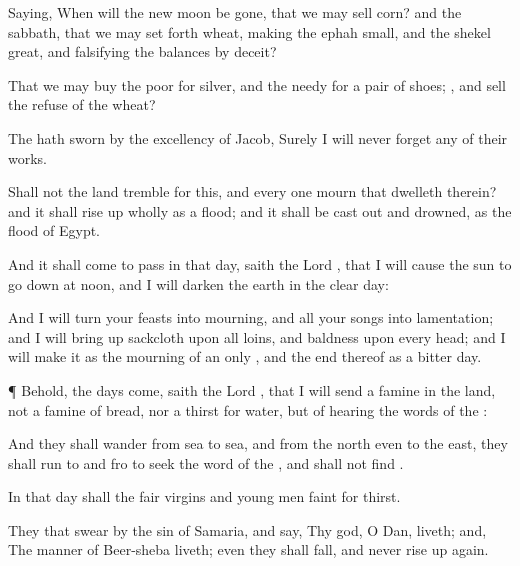 {Saying, When will the new
moon be
gone, that we may
sell
corn? and the
sabbath, that we may set
forth
wheat, making the
ephah
small, and the
shekel
great, and
falsifying the
balances by
deceit?

That we may
buy the
poor for
silver, and the
needy for a pair of
shoes;
{}, and
sell the
refuse of the
wheat?

The
{} hath
sworn by the
excellency of
Jacob, Surely I will
never
forget any of their
works.

Shall not the
land
tremble for this, and every one
mourn that
dwelleth therein? and it shall rise
up wholly as a
flood; and it shall be cast
out and
drowned, as
{} the
flood of
Egypt.

And it shall come to pass in that
day,
saith the
Lord
{}, that I will cause the
sun to go
down at
noon, and I will
darken the
earth in the
clear
day:

And I will
turn your
feasts into
mourning, and all your
songs into
lamentation; and I will bring
up
sackcloth upon all
loins, and
baldness upon every
head; and I will
make it as the
mourning of an
only
{}, and the
end thereof as a
bitter
day.


\par }{\PP {}¶ Behold, the
days
come,
saith the
Lord
{}, that I will
send a
famine in the
land, not a
famine of
bread, nor a
thirst for
water, but of
hearing the
words of the
{}:

And they shall
wander from
sea to
sea, and from the
north even to the
east, they shall run to and
fro to
seek the
word of the
{}, and shall not
find
{}.

In that
day shall the
fair
virgins and young
men
faint for
thirst.

They that
swear by the
sin of
Samaria, and
say, Thy
god, O
Dan,
liveth; and, The
manner of
Beer-sheba
liveth; even they shall
fall, and never rise
up again.




\par }
